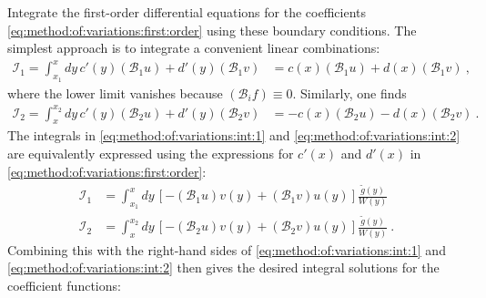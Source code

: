 Integrate the first-order differential equations for the coefficients \eqref{eq:method:of:variations:first:order} using these boundary conditions. The simplest approach is to integrate a convenient linear combinations:
\begin{align}
	\mathcal{I}_1 = 
	\int_{x_1}^x
	dy\, c'(y)(\mathcal B_1 u) + d'(y) (\mathcal B_1 v)
	&= c(x) (\mathcal B_1 u) + d(x) (\mathcal B_1 v) \ ,
	\label{eq:method:of:variations:int:1}
\end{align}
where the lower limit vanishes because $(\mathcal B_i f) \equiv 0$. Similarly, one finds
\begin{align}
	\mathcal{I}_2 = 
	\int_{x}^{x_2}
	dy\, c'(y)(\mathcal B_2 u) + d'(y) (\mathcal B_2 v)
	&= -c(x) (\mathcal B_2 u) - d(x) (\mathcal B_2 v) \ .
	\label{eq:method:of:variations:int:2}
\end{align}
The integrals in \eqref{eq:method:of:variations:int:1} and \eqref{eq:method:of:variations:int:2} are equivalently expressed using the expressions for $c'(x)$ and $d'(x)$ in \eqref{eq:method:of:variations:first:order}:
\begin{align}
	\mathcal{I}_1 
	&= 
	\int_{x_1}^x dy \,
	\left[
	- (\mathcal B_1 u) v(y)
	+ (\mathcal B_1 v) u(y)
	\right]
	\frac{
	\tilde g(y)
	}{W(y)}	
	\\
	\mathcal{I}_2 
	&=
	\int_{x}^{x_2}
	dy\, 
	\left[  - (\mathcal B_2 u) v(y) 
			+ (\mathcal B_2 v) u(y)
	\right]
	\frac{
	\tilde g(y)
	}{W(y)} 
	\ .
\end{align}
Combining this with the right-hand sides of \eqref{eq:method:of:variations:int:1} and \eqref{eq:method:of:variations:int:2} then gives the desired integral solutions for the coefficient functions:
